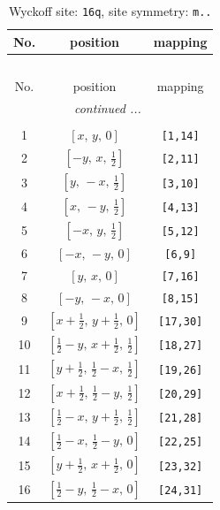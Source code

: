 \documentclass[fleqn,8pt]{jsarticle}
\begin{document}
\renewcommand{\arraystretch}{1.2}
\begin{longtable}{ccc}
\caption{Wyckoff site: {\tt 16q}, site symmetry: {\tt m..}}
 \\
 \hline \hline
No. & position & mapping \\ \hline \endfirsthead

\multicolumn{2}{l}{\tablename\ \thetable{}} \\
 \hline \hline
No. & position & mapping \\ \hline \endhead

 \hline \hline
\multicolumn{2}{r}{\footnotesize\it continued ...} \\ \endfoot

 \hline \hline
\multicolumn{2}{r}{} \\ \endlastfoot

1 & $\left[ x,\, y,\, 0 \right]$ & {\tt [1,14]} \\ \hline
2 & $\left[ - y,\, x,\, \frac{1}{2} \right]$ & {\tt [2,11]} \\ \hline
3 & $\left[ y,\, - x,\, \frac{1}{2} \right]$ & {\tt [3,10]} \\ \hline
4 & $\left[ x,\, - y,\, \frac{1}{2} \right]$ & {\tt [4,13]} \\ \hline
5 & $\left[ - x,\, y,\, \frac{1}{2} \right]$ & {\tt [5,12]} \\ \hline
6 & $\left[ - x,\, - y,\, 0 \right]$ & {\tt [6,9]} \\ \hline
7 & $\left[ y,\, x,\, 0 \right]$ & {\tt [7,16]} \\ \hline
8 & $\left[ - y,\, - x,\, 0 \right]$ & {\tt [8,15]} \\ \hline
9 & $\left[ x + \frac{1}{2},\, y + \frac{1}{2},\, 0 \right]$ & {\tt [17,30]} \\ \hline
10 & $\left[ \frac{1}{2} - y,\, x + \frac{1}{2},\, \frac{1}{2} \right]$ & {\tt [18,27]} \\ \hline
11 & $\left[ y + \frac{1}{2},\, \frac{1}{2} - x,\, \frac{1}{2} \right]$ & {\tt [19,26]} \\ \hline
12 & $\left[ x + \frac{1}{2},\, \frac{1}{2} - y,\, \frac{1}{2} \right]$ & {\tt [20,29]} \\ \hline
13 & $\left[ \frac{1}{2} - x,\, y + \frac{1}{2},\, \frac{1}{2} \right]$ & {\tt [21,28]} \\ \hline
14 & $\left[ \frac{1}{2} - x,\, \frac{1}{2} - y,\, 0 \right]$ & {\tt [22,25]} \\ \hline
15 & $\left[ y + \frac{1}{2},\, x + \frac{1}{2},\, 0 \right]$ & {\tt [23,32]} \\ \hline
16 & $\left[ \frac{1}{2} - y,\, \frac{1}{2} - x,\, 0 \right]$ & {\tt [24,31]} \\
\end{longtable}
\end{document}
